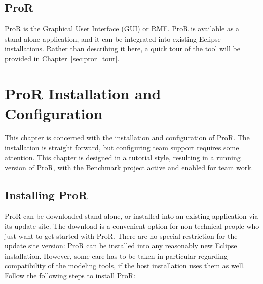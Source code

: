\documentclass{template/openetcs_report}
\begin{document}
\section{ProR}
\label{pror}

ProR is the Graphical User Interface (GUI) or RMF.  ProR is available as a stand-alone application, and it can be integrated into existing Eclipse installations.  Rather than describing it here, a quick tour of the tool will be provided in Chapter~\ref{sec:pror_tour}.

\chapter{ProR Installation and Configuration}

This chapter is concerned with the installation and configuration of ProR.  The installation is straight forward, but configuring team support requires some attention.  This chapter is designed in a tutorial style, resulting in a running version of ProR, with the Benchmark project active and enabled for team work.

\section{Installing ProR}

ProR can be downloaded stand-alone, or installed into an existing application via its update site.  The download is a convenient option for non-technical people who just want to get started with ProR.  There are no special restriction for the update site version: ProR can be installed into any reasonably new Eclipse installation.  However, some care has to be taken in particular regarding compatibility of the modeling tools, if the host installation uses them as well.  Follow the following steps to install ProR:
\end{document}
